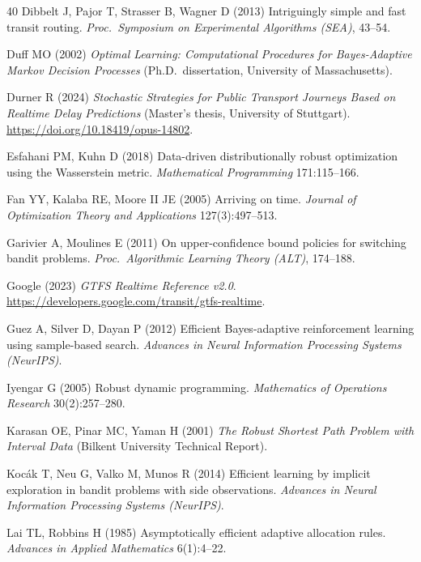 \documentclass[opre,dblanonrev]{informs4}
\begin{document}
\begin{thebibliography}{40}
Dibbelt J, Pajor T, Strasser B, Wagner D (2013) Intriguingly simple and fast
transit routing. \emph{Proc.\ Symposium on Experimental Algorithms (SEA)},
43--54.

Duff MO (2002) \emph{Optimal Learning: Computational Procedures for
Bayes-Adaptive Markov Decision Processes} (Ph.D.\ dissertation, University
of Massachusetts).

Durner R (2024) \emph{Stochastic Strategies for Public Transport Journeys
Based on Realtime Delay Predictions} (Master's thesis, University of
Stuttgart). \url{https://doi.org/10.18419/opus-14802}.

Esfahani PM, Kuhn D (2018) Data-driven distributionally robust optimization
using the Wasserstein metric. \emph{Mathematical Programming} 171:115--166.

Fan YY, Kalaba RE, Moore II JE (2005) Arriving on time.
\emph{Journal of Optimization Theory and Applications} 127(3):497--513.

Garivier A, Moulines E (2011) On upper-confidence bound policies for
switching bandit problems. \emph{Proc.\ Algorithmic Learning Theory (ALT)},
174--188.

Google (2023) \emph{GTFS Realtime Reference v2.0}.
\url{https://developers.google.com/transit/gtfs-realtime}.

Guez A, Silver D, Dayan P (2012) Efficient Bayes-adaptive reinforcement
learning using sample-based search. \emph{Advances in Neural Information
Processing Systems (NeurIPS)}.

Iyengar G (2005) Robust dynamic programming. \emph{Mathematics of Operations
Research} 30(2):257--280.

Karasan OE, Pinar MC, Yaman H (2001) \emph{The Robust Shortest Path Problem
with Interval Data} (Bilkent University Technical Report).

Koc{\'a}k T, Neu G, Valko M, Munos R (2014) Efficient learning by implicit
exploration in bandit problems with side observations. \emph{Advances in
Neural Information Processing Systems (NeurIPS)}.

Lai TL, Robbins H (1985) Asymptotically efficient adaptive allocation rules.
\emph{Advances in Applied Mathematics} 6(1):4--22.


\end{thebibliography}
\end{document}
